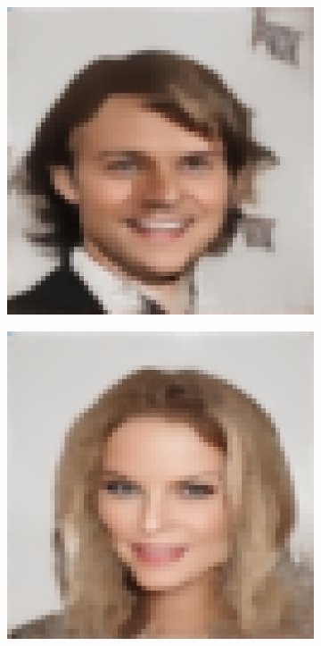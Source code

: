 \documentclass{IEEEcsmag}
\begin{document}
\begin{figure}[ht]
    \smallskip
    \setcounter{subfigure}{0}

    \begin{subfigure}{0.12\textwidth}
        \includegraphics[width=\linewidth]{images/CelebA/1/cvae_4.png}
    \end{subfigure}
    \begin{subfigure}{0.12\textwidth}
        \includegraphics[width=\linewidth]{images/CelebA/1/cvae_2.png}

\end{subfigure}
\end{figure}
\end{document}
